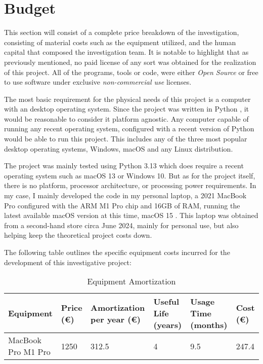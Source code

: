 \documentclass[12pt]{report} %
\begin{document}
\section{Budget}
This section will consist of a complete price breakdown of the investigation, consisting of material costs such as the equipment utilized, and the human capital that composed the investigation team. It is notable to highlight that as previously mentioned, no paid license of any sort was obtained for the realization of this project. All of the programs, tools or code, were either \textit{Open Source} or free to use software under exclusive \textit{non-commercial use} licenses.

The most basic requirement for the physical needs of this project is a computer with an desktop operating system. Since the project was written in Python \cite{python}, it would be reasonable to consider it platform agnostic. Any computer capable of running any recent operating system, configured with a recent version of Python would be able to run this project. This includes any of the three most popular desktop operating systems, Windows, macOS and any Linux distribution.

The project was mainly tested using Python 3.13 \cite{python3.13} which does require a recent operating system such as macOS 13 or Windows 10. But as for the project itself, there is no platform, processor architecture, or processing power requirements. In my case, I mainly developed the code in my personal laptop, a 2021 MacBook Pro configured with the ARM M1 Pro chip and 16GB of RAM, running the latest available macOS version at this time, macOS 15 \cite{macos}. This laptop was obtained from a second-hand store circa June 2024, mainly for personal use, but also helping keep the theoretical project costs down.

The following table outlines the specific equipment costs incurred for the development of this investigative project:
\begin{table}[H]
	\caption{Equipment Amortization}
	\centering
	\begin{tabular}{|P{2.8cm}|P{1.8cm}|P{2.5cm}|P{1.5cm}|P{2cm}|P{1.5cm}|}
		\hline
		\textbf{Equipment} & \textbf{Price (€)} & \textbf{Amortization per year (€)} & \textbf{Useful Life (years)} & \textbf{Usage Time (months)} & \textbf{Cost (€)} \\
		\hline
		MacBook Pro M1 Pro & 1250 & 312.5 & 4 & 9.5 & 247.4 \\
		\hline
	\end{tabular}
\end{table}
\end{document}

